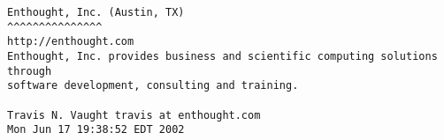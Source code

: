 \begin{verbatim}
Enthought, Inc. (Austin, TX)
^^^^^^^^^^^^^^^
http://enthought.com
Enthought, Inc. provides business and scientific computing solutions through
software development, consulting and training.

Travis N. Vaught travis at enthought.com
Mon Jun 17 19:38:52 EDT 2002
\end{verbatim}
